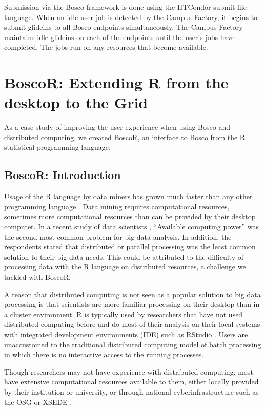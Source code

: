 Submission via the Bosco framework is done using the HTCondor submit file language.  When an idle user job is detected by the Campus Factory, it begins to submit glideins to all Bosco endpoints simultaneously.  The Campus Factory maintains idle glideins on each of the endpoints until the user's jobs have completed.  The jobs run on any resources that become available.


\section{BoscoR: Extending R from the desktop to the Grid}

As a case study of improving the user experience when using Bosco and distributed computing, we created BoscoR, an interface to Bosco from the R statistical programming language.  %


\subsection{BoscoR: Introduction}
Usage of the R language \cite{team2012r} by data miners has grown much faster than any other programming language \cite{rexer2013, KDnuggets2013}.  Data mining requires computational resources, sometimes more computational resources than can be provided by their desktop computer.  In a recent study of data scientists \cite{rexer2013}, ``Available computing power'' was the second most common problem for big data analysis.  In addition, the respondents stated that distributed or parallel processing was the least common solution to their big data needs.  This could be attributed to the difficulty of processing data with the R language on distributed resources, a challenge we tackled with BoscoR.

A reason that distributed computing is not seen as a popular solution to big data processing is that scientists are more familiar processing on their desktop than in a cluster environment.  R is typically used by researchers that have not used distributed computing before and do most of their analysis on their local systems with integrated development environments (IDE) such as RStudio \cite{racine2012rstudio}.  Users are unaccustomed to the traditional distributed computing model of batch processing in which there is no interactive access to the running processes.

Though researchers may not have experience with distributed computing, most have extensive computational resources available to them, either locally provided by their institution or university, or through national cyberinfrastructure such as the OSG \cite{pordes2007open} or XSEDE \cite{xsede}.



